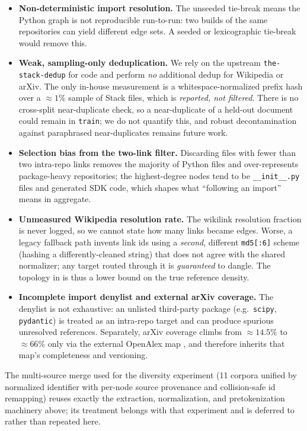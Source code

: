 \begin{itemize}
  \item \textbf{Non-deterministic import resolution.} The unseeded tie-break
  means the Python graph is not reproducible run-to-run: two builds of the same
  repositories can yield different edge sets. A seeded or lexicographic tie-break
  would remove this.

  \item \textbf{Weak, sampling-only deduplication.} We rely on the upstream
  \texttt{the-stack-dedup} for code and perform \emph{no} additional dedup for
  Wikipedia or arXiv. The only in-house measurement is a whitespace-normalized
  prefix hash over a $\approx 1\%$ sample of Stack files, which is
  \emph{reported, not filtered}. There is no cross-split near-duplicate check, so
  a near-duplicate of a held-out document could remain in \texttt{train}; we do
  not quantify this, and robust decontamination against paraphrased
  near-duplicates \citep{yang2023rephrased} remains future work.

  \item \textbf{Selection bias from the two-link filter.} Discarding files with
  fewer than two intra-repo links removes the majority of Python files and
  over-represents package-heavy repositories; the highest-degree nodes tend to be
  \texttt{\_\_init\_\_.py} files and generated SDK code, which shapes what
  ``following an import'' means in aggregate.

  \item \textbf{Unmeasured Wikipedia resolution rate.} The wikilink resolution
  fraction is never logged, so we cannot state how many links became edges.
  Worse, a legacy fallback path invents link ids using a \emph{second}, different
  \texttt{md5[:6]} scheme (hashing a differently-cleaned string) that does not
  agree with the shared normalizer; any target routed through it is
  \emph{guaranteed} to dangle. The topology in  is thus
  a lower bound on the true reference density.

  \item \textbf{Incomplete import denylist and external arXiv coverage.} The
  denylist is not exhaustive: an unlisted third-party package (e.g.\
  \texttt{scipy}, \texttt{pydantic}) is treated as an intra-repo target and can
  produce spurious unresolved references. Separately, arXiv coverage climbs from
  $\approx 14.5\%$ to $\approx 66\%$ only via the external OpenAlex map
  \citep{priem2022openalex}, and therefore inherits that map's completeness and
  versioning.
\end{itemize}

The multi-source merge used for the diversity experiment (11 corpora unified by
normalized identifier with per-node source provenance and collision-safe id
remapping) reuses exactly the extraction, normalization, and pretokenization
machinery above; its treatment belongs with that experiment and is deferred to
\Cref{app:recipe} rather than repeated here.
